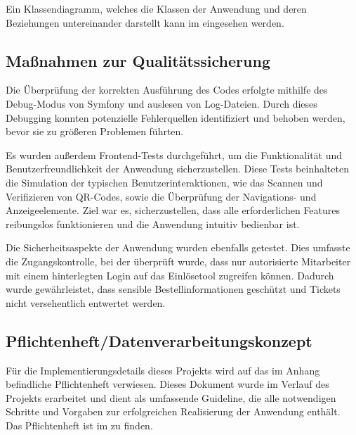 Ein Klassendiagramm, welches die Klassen der Anwendung und deren Beziehungen untereinander darstellt kann im  eingesehen werden.


\subsection{Maßnahmen zur Qualitätssicherung}
\label{sec:Qualitaetssicherung}

Die Überprüfung der korrekten Ausführung des Codes erfolgte mithilfe des Debug-Modus von Symfony und auslesen von Log-Dateien. Durch dieses Debugging konnten potenzielle Fehlerquellen identifiziert und behoben werden, bevor sie zu größeren Problemen führten.

Es wurden außerdem Frontend-Tests durchgeführt, um die Funktionalität und Benutzerfreundlichkeit der Anwendung sicherzustellen. Diese Tests beinhalteten die Simulation der typischen Benutzerinteraktionen, wie das Scannen und Verifizieren von QR-Codes, sowie die Überprüfung der Navigations- und Anzeigeelemente. Ziel war es, sicherzustellen, dass alle erforderlichen Features reibungslos funktionieren und die Anwendung intuitiv bedienbar ist.

Die Sicherheitsaspekte der Anwendung wurden ebenfalls getestet. Dies umfasste die Zugangskontrolle, bei der überprüft wurde, dass nur autorisierte Mitarbeiter mit einem hinterlegten Login auf das Einlösetool zugreifen können. Dadurch wurde gewährleistet, dass sensible Bestellinformationen geschützt und Tickets nicht versehentlich entwertet werden.

\subsection{Pflichtenheft/Datenverarbeitungskonzept}
\label{sec:Pflichtenheft}

Für die Implementierungsdetails dieses Projekts wird auf das im Anhang befindliche Pflichtenheft verwiesen. Dieses Dokument wurde im Verlauf des Projekts erarbeitet und dient als umfassende Guideline, die alle notwendigen Schritte und Vorgaben zur erfolgreichen Realisierung der Anwendung enthält. Das Pflichtenheft ist im  zu finden.